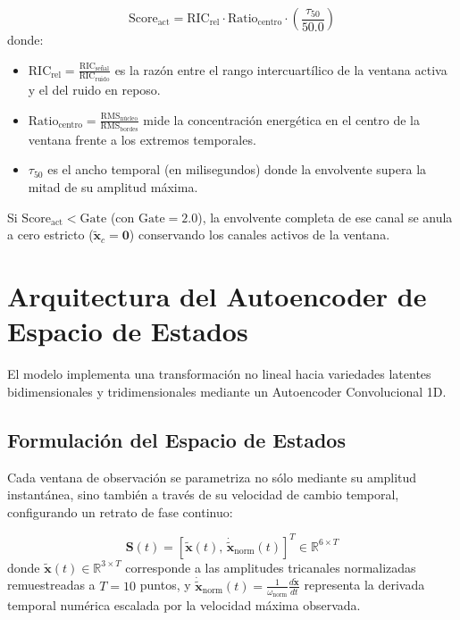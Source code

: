 \documentclass[11pt,a4paper]{article}
\begin{document}
\begin{equation}
    \text{Score}_{\text{act}} = \text{RIC}_{\text{rel}} \cdot \text{Ratio}_{\text{centro}} \cdot \left( \frac{\tau_{50}}{50.0} \right)
    \label{eq:score_act}
\end{equation}
donde:
\begin{itemize}
    \item $\text{RIC}_{\text{rel}} = \frac{\text{RIC}_{\text{señal}}}{\text{RIC}_{\text{ruido}}}$ es la razón entre el rango intercuartílico de la ventana activa y el del ruido en reposo.
    \item $\text{Ratio}_{\text{centro}} = \frac{\text{RMS}_{\text{núcleo}}}{\text{RMS}_{\text{bordes}}}$ mide la concentración energética en el centro de la ventana frente a los extremos temporales.
    \item $\tau_{50}$ es el ancho temporal (en milisegundos) donde la envolvente supera la mitad de su amplitud máxima.
\end{itemize}
Si $\text{Score}_{\text{act}} < \text{Gate}$ (con $\text{Gate} = 2.0$), la envolvente completa de ese canal se anula a cero estricto ($\tilde{\mathbf{x}}_c = \mathbf{0}$) conservando los canales activos de la ventana.

\section{Arquitectura del Autoencoder de Espacio de Estados}
\label{sec:arquitectura_red}

El modelo implementa una transformación no lineal hacia variedades latentes bidimensionales y tridimensionales mediante un Autoencoder Convolucional 1D.

\subsection{Formulación del Espacio de Estados}
\label{subsec:espacio_estados}

Cada ventana de observación se parametriza no sólo mediante su amplitud instantánea, sino también a través de su velocidad de cambio temporal, configurando un retrato de fase continuo:

\begin{equation}
    \mathbf{S}(t) = \left[ \tilde{\mathbf{x}}(t),\, \dot{\tilde{\mathbf{x}}}_{\text{norm}}(t) \right]^T \in \mathbb{R}^{6 \times T}
    \label{eq:estado_cinematico}
\end{equation}
donde $\tilde{\mathbf{x}}(t) \in \mathbb{R}^{3 \times T}$ corresponde a las amplitudes tricanales normalizadas remuestreadas a $T = 10$ puntos, y $\dot{\tilde{\mathbf{x}}}_{\text{norm}}(t) = \frac{1}{\omega_{\text{norm}}} \frac{d\tilde{\mathbf{x}}}{dt}$ representa la derivada temporal numérica escalada por la velocidad máxima observada.
\end{document}
